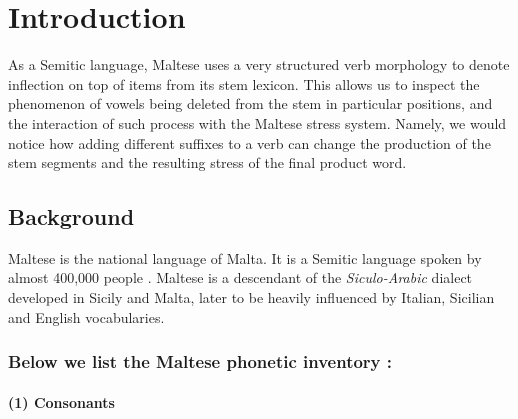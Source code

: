 \documentclass[12pt,draft]{article}
\begin{document}
\maketitle


\section{Introduction}

As a Semitic language, Maltese uses a very structured verb morphology to denote inflection on top of items from its stem lexicon.
This allows us to inspect the phenomenon of vowels being deleted from the stem in particular positions, and the interaction of such process with the Maltese stress system.
Namely, we would notice how adding different suffixes to a verb can change the production of the stem segments and the resulting stress of the final product word.

\subsection{Background}
Maltese is the national language of Malta. It is a Semitic language spoken by almost 400,000 people \cite{borg1997}.
Maltese is a descendant of the \emph{Siculo-Arabic} dialect developed in Sicily and Malta, later to be heavily influenced by Italian, Sicilian and English vocabularies.

\subsubsection*{\textmd{Below we list the Maltese phonetic inventory \cite{borg1997}:}}

\paragraph*{(1) Consonants}
\mbox{} %

\end{document}
